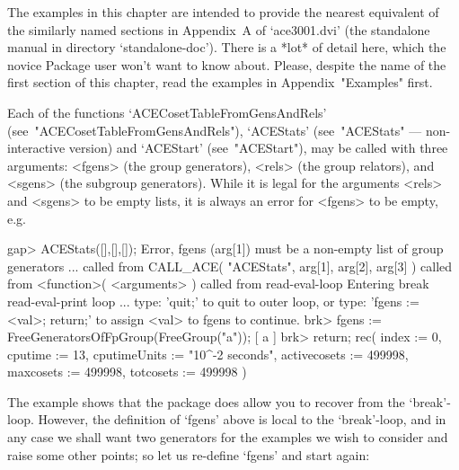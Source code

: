 

The examples in this chapter  are  intended  to  provide  the  nearest
{\GAP} equivalent of the similarly named  sections  in  Appendix~A  of
`ace3001.dvi' (the standalone manual in  directory  `standalone-doc').
There is a *lot* of detail here, which the novice {\ACE} Package  user
won't want to know about.  Please,  despite  the  name  of  the  first
section of this chapter,  read  the  examples  in  Appendix~"Examples"
first.


Each     of     the      functions      `ACECosetTableFromGensAndRels'
(see~"ACECosetTableFromGensAndRels"), `ACEStats'  (see~"ACEStats"  ---
non-interactive  version)  and  `ACEStart'  (see~"ACEStart"),  may  be
called with three arguments: <fgens> (the  group  generators),  <rels>
(the group relators), and <sgens> (the subgroup generators). While  it
is legal for the arguments <rels> and <sgens> to be empty lists, it is
always an error for <fgens> to be empty, e.g.

\beginexample
gap> ACEStats([],[],[]);
Error, fgens (arg[1]) must be a non-empty list of group generators ...
 called from
CALL_ACE( "ACEStats", arg[1], arg[2], arg[3] ) called from
<function>( <arguments> ) called from read-eval-loop
Entering break read-eval-print loop ...
 type: 'quit;' to quit to outer loop, or
 type: 'fgens := <val>; return;' to assign <val> to fgens to continue.
brk> fgens := FreeGeneratorsOfFpGroup(FreeGroup("a"));
[ a ]
brk> return;
rec( index := 0, cputime := 13, cputimeUnits := "10^-2 seconds", 
  activecosets := 499998, maxcosets := 499998, totcosets := 499998 )
\endexample

The example shows that the {\ACE} package does allow  you  to  recover
from the `break'-loop. However, the definition  of  `fgens'  above  is
local to  the  `break'-loop,  and  in  any  case  we  shall  want  two
generators for the examples we wish to consider and raise  some  other
points; so let us re-define `fgens' and start again:

